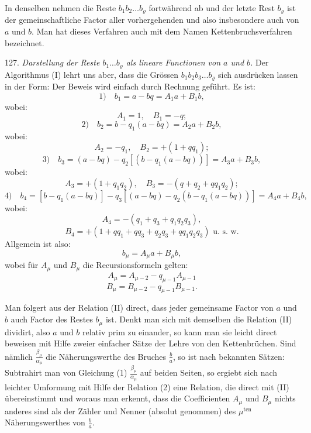 In denselben nehmen die Reste $b_1 b_2 \ldots b_\varrho$ fortwährend ab und der letzte Rest $b_\varrho$ ist der gemeinschaftliche Factor aller vorhergehenden und also insbesondere auch von $a$ und $b$. Man hat dieses Verfahren auch mit dem Namen Kettenbruchsverfahren bezeichnet.

127. \textit{Darstellung der Reste $b_1 \ldots b_\varrho$ als lineare Functionen von $a$ und $b$.} Der Algorithmus (I) lehrt uns aber, dass die Grössen $b_1 b_2 b_3 \ldots b_\varrho$ sich ausdrücken lassen in der Form:
Der Beweis wird einfach durch Rechnung geführt. Es ist:
\[ 1)\quad b_1 = a - bq = A_1 a + B_1 b, \]
wobei:
\[ A_1 = 1, \quad B_1 = -q; \]
\[ 2)\quad b_2 = b - q_1(a - bq) = A_2 a + B_2 b, \]
wobei:
\[ A_2 = -q_1, \quad B_2 = +(1 + qq_1); \]
\[ 3)\quad b_3 = (a - bq) - q_2[(b - q_1(a - bq))] = A_3 a + B_3 b, \]
wobei:
\[ A_3 = +(1 + q_1q_2), \quad B_3 = -(q + q_2 + qq_1q_2); \]
\[ 4)\quad b_4 = [b - q_1(a - bq)] - q_3[(a - bq) - q_2(b - q_1(a - bq))] = A_4 a + B_4 b, \]
wobei:
\[ A_4 = -(q_1 + q_3 + q_1q_2q_3), \]
\[ B_4 = +(1 + qq_1 + qq_3 + q_2q_3 + qq_1q_2q_3) \text{ u. s. w.} \]
Allgemein ist also:
\[ b_\mu = A_\mu a + B_\mu b, \]
wobei für $A_\mu$ und $B_\mu$ die Recursionsformeln gelten:
\[ A_\mu = A_{\mu-2} - q_{\mu-1} A_{\mu-1} \]
\[ B_\mu = B_{\mu-2} - q_{\mu-1} B_{\mu-1}. \]


Man folgert aus der Relation (II) direct, dass jeder gemeinsame Factor von $a$ und $b$ auch Factor des Restes $b_\mu$ ist. Denkt man sich mit demselben die Relation (II) dividirt, also $a$ und $b$ relativ prim zu einander, so kann man sie leicht direct beweisen mit Hilfe zweier einfacher Sätze der Lehre von den Kettenbrüchen. Sind nämlich $\frac{\beta_\mu}{\alpha_\mu}$ die Näherungswerthe des Bruches $\frac{b}{a}$, so ist nach bekannten Sätzen:
Subtrahirt man von Gleichung (1) $\frac{\beta_\mu}{\alpha_\mu}$ auf beiden Seiten, so ergiebt sich nach leichter Umformung mit Hilfe der Relation (2)
eine Relation, die direct mit (II) übereinstimmt und woraus man erkennt, dass die Coefficienten $A_\mu$ und $B_\mu$ nichts anderes sind als der Zähler und Nenner (absolut genommen) des $\mu^{\mathrm{ten}}$ Näherungswerthes von $\frac{b}{a}$.


